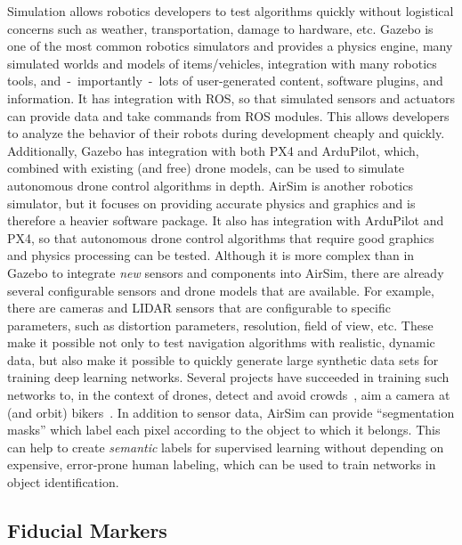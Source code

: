 Simulation allows robotics developers to test algorithms quickly without logistical concerns such as
weather, transportation, damage to hardware, etc.
Gazebo is one of the most common robotics simulators and provides a physics engine,
many simulated worlds and models of items/vehicles,
integration with many robotics tools,
and~-~importantly~-~lots of user-generated content, software plugins, and information.
It has integration with ROS, so that simulated sensors and actuators can provide data and take commands
from ROS modules.
This allows developers to analyze the behavior of their robots during development cheaply and quickly.
Additionally, Gazebo has integration with both PX4 and ArduPilot, which, combined with existing (and free)
drone models, can be used to simulate autonomous drone control algorithms in depth.
AirSim is another robotics simulator, but it focuses on providing accurate physics and graphics
and is therefore a heavier software package.
It also has integration with ArduPilot and PX4, so that autonomous drone control algorithms
that require good graphics and physics processing can be tested.
Although it is more complex than in Gazebo to integrate \textit{new} sensors and components into
AirSim, there are already several configurable sensors and drone models that are available.
For example, there are cameras and LIDAR sensors that are configurable to specific parameters,
such as distortion parameters, resolution, field of view, etc.
These make it possible not only to test navigation algorithms with realistic, dynamic data,
but also make it possible to quickly generate large synthetic data sets for training
deep learning networks.
Several projects have succeeded in training such networks to, in the context of drones,
detect and avoid crowds~\cite{crowd_detection_airsim},
aim a camera at (and orbit) bikers~\cite{biker_orbit_airsim}.
In addition to sensor data, AirSim can provide ``segmentation masks'' which label each pixel
according to the object to which it belongs.
This can help to create \textit{semantic} labels for supervised learning without depending
on expensive, error-prone human labeling,
which can be used to train networks in object identification.

\subsection{Fiducial Markers}

